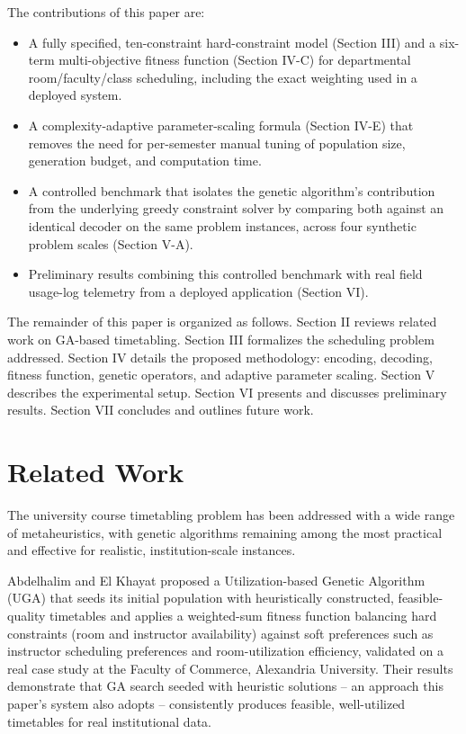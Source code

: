 \documentclass[conference]{IEEEtran}
\begin{document}
The contributions of this paper are:
\begin{itemize}
\item A fully specified, ten-constraint hard-constraint model (Section III) and a six-term multi-objective fitness function (Section IV-C) for departmental room/faculty/class scheduling, including the exact weighting used in a deployed system.
\item A complexity-adaptive parameter-scaling formula (Section IV-E) that removes the need for per-semester manual tuning of population size, generation budget, and computation time.
\item A controlled benchmark that isolates the genetic algorithm's contribution from the underlying greedy constraint solver by comparing both against an identical decoder on the same problem instances, across four synthetic problem scales (Section V-A).
\item Preliminary results combining this controlled benchmark with real field usage-log telemetry from a deployed application (Section VI).
\end{itemize}

The remainder of this paper is organized as follows. Section II reviews related work on GA-based timetabling. Section III formalizes the scheduling problem addressed. Section IV details the proposed methodology: encoding, decoding, fitness function, genetic operators, and adaptive parameter scaling. Section V describes the experimental setup. Section VI presents and discusses preliminary results. Section VII concludes and outlines future work.

\section{Related Work}

The university course timetabling problem has been addressed with a wide range of metaheuristics, with genetic algorithms remaining among the most practical and effective for realistic, institution-scale instances.

Abdelhalim and El Khayat \cite{abdelhalim2016} proposed a Utilization-based Genetic Algorithm (UGA) that seeds its initial population with heuristically constructed, feasible-quality timetables and applies a weighted-sum fitness function balancing hard constraints (room and instructor availability) against soft preferences such as instructor scheduling preferences and room-utilization efficiency, validated on a real case study at the Faculty of Commerce, Alexandria University. Their results demonstrate that GA search seeded with heuristic solutions -- an approach this paper's system also adopts -- consistently produces feasible, well-utilized timetables for real institutional data.
\end{document}
